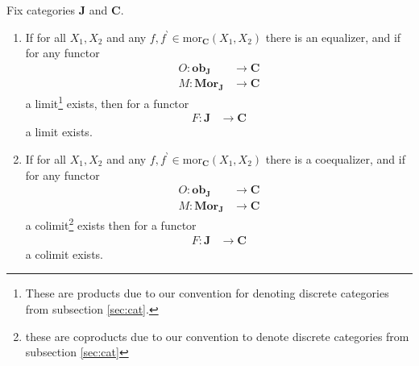 \begin{thm}
\label{thm:limitexistence}
Fix categories $\mathbf{J}$ and $\mathbf{C}$.
\begin{enumerate}
\item[(1T)]
If for all $X_{1},X_{2}$ and any $f,f^{\backprime} \in \mathrm{mor}_{\mathbf{C}}(X_{1},X_{2})$ there is an equalizer, and if for any functor
\begin{align*}
  O
  \colon
  \mathbf{ob}_{\mathbf{J}}
  &\rightarrow
  \mathbf{C}
  \\
  M
  \colon
  \mathbf{Mor}_{\mathbf{J}}
  &\rightarrow
  \mathbf{C}
\end{align*}
a limit\footnote{These are products due to our convention for denoting discrete categories from subsection \ref{sec:cat}.} exists, then for a functor
\begin{align*}
  F
  \colon
  \mathbf{J}
  &\rightarrow
  \mathbf{C}
\end{align*}
a limit exists.
\item[(1I)]
If for all $X_{1},X_{2}$ and any $f,f^{\backprime} \in \mathrm{mor}_{\mathbf{C}}(X_{1},X_{2})$ there is a coequalizer, and if for any functor
\begin{align*}
  O
  \colon
  \mathbf{ob}_{\mathbf{J}}
  &\rightarrow
  \mathbf{C}
  \\
  M
  \colon
  \mathbf{Mor}_{\mathbf{J}}
  &\rightarrow
  \mathbf{C}
\end{align*}
a colimit\footnote{these are coproducts due to our convention to denote discrete categories from subsection \ref{sec:cat}} exists then for a functor
\begin{align*}
  F
  \colon
  \mathbf{J}
  &\rightarrow
  \mathbf{C}
\end{align*}
a colimit exists.
\end{enumerate}
\end{thm}
